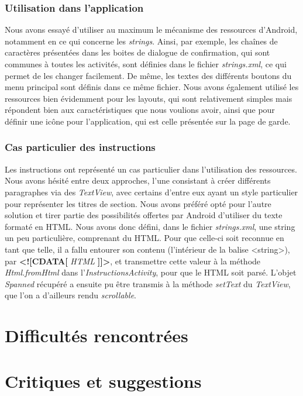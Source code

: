 \documentclass[12pt, a4paper]{article}%
\begin{document}
    \subsubsection{Utilisation dans l'application}
    Nous avons essayé d'utiliser au maximum le mécanisme des ressources d'Android, notamment en ce qui concerne les \textit{strings}. Ainsi, par exemple, les chaînes de caractères présentées dans les boites de dialogue de confirmation, qui sont communes à toutes les activités, sont définies dans le fichier \textit{strings.xml}, ce qui permet de les changer facilement. De même, les textes des différents boutons du menu principal sont définis dans ce même fichier.
    Nous avons également utilisé les ressources bien évidemment pour les layouts, qui sont relativement simples mais répondent bien aux caractéristiques que nous voulions avoir, ainsi que pour définir une icône pour l'application, qui est celle présentée sur la page de garde.
     
     \subsubsection{Cas particulier des instructions}
     Les instructions ont représenté un cas particulier dans l'utilisation des ressources. Nous avons hésité entre deux approches, l'une consistant à créer différents paragraphes via des \textit{TextView}, avec certains d'entre eux ayant un style particulier pour représenter les titres de section. Nous avons préféré opté pour l'autre solution et tirer partie des possibilités offertes par Android d'utiliser du texte formaté en HTML. Nous avons donc défini, dans le fichier \textit{strings.xml}, une string un peu particulière, comprenant du HTML. Pour que celle-ci soit reconnue en tant que telle, il a fallu entourer son contenu (l'intérieur de la balise <string>), par \textbf{<![CDATA[} \textit{HTML} \textbf{]]>}, et transmettre cette valeur à la méthode \textit{Html.fromHtml} dans l'\textit{InstructionsActivity}, pour que le HTML soit parsé. L'objet \textit{Spanned} récupéré a ensuite pu être transmis à la méthode \textit{setText} du \textit{TextView}, que l'on a d'ailleurs rendu \textit{scrollable}.
      
\section{Difficultés rencontrées}

\section{Critiques et suggestions}
\end{document}
